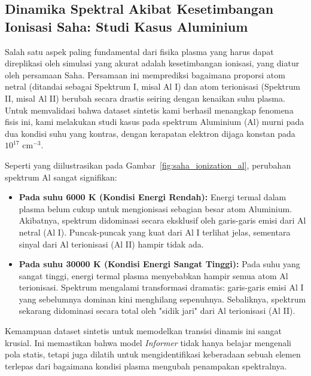 \subsection{Dinamika Spektral Akibat Kesetimbangan Ionisasi Saha: Studi Kasus Aluminium}
Salah satu aspek paling fundamental dari fisika plasma yang harus dapat direplikasi oleh simulasi yang akurat adalah kesetimbangan ionisasi, yang diatur oleh persamaan Saha. Persamaan ini memprediksi bagaimana proporsi atom netral (ditandai sebagai Spektrum I, misal Al I) dan atom terionisasi (Spektrum II, misal Al II) berubah secara drastis seiring dengan kenaikan suhu plasma. Untuk memvalidasi bahwa dataset sintetis kami berhasil menangkap fenomena fisis ini, kami melakukan studi kasus pada spektrum Aluminium (Al) murni pada dua kondisi suhu yang kontras, dengan kerapatan elektron dijaga konstan pada $10^{17}$ cm$^{-3}$.

Seperti yang diilustrasikan pada Gambar~\ref{fig:saha_ionization_al}, perubahan spektrum Al sangat signifikan:
\begin{itemize}
    \item \textbf{Pada suhu 6000 K (Kondisi Energi Rendah):} Energi termal dalam plasma belum cukup untuk mengionisasi sebagian besar atom Aluminium. Akibatnya, spektrum didominasi secara eksklusif oleh garis-garis emisi dari Al netral (Al I). Puncak-puncak yang kuat dari Al I terlihat jelas, sementara sinyal dari Al terionisasi (Al II) hampir tidak ada.
    \item \textbf{Pada suhu 30000 K (Kondisi Energi Sangat Tinggi):} Pada suhu yang sangat tinggi, energi termal plasma menyebabkan hampir semua atom Al terionisasi. Spektrum mengalami transformasi dramatis: garis-garis emisi Al I yang sebelumnya dominan kini menghilang sepenuhnya. Sebaliknya, spektrum sekarang didominasi secara total oleh "sidik jari" dari Al terionisasi (Al II).
\end{itemize}
Kemampuan dataset sintetis untuk memodelkan transisi dinamis ini sangat krusial. Ini memastikan bahwa model \textit{Informer} tidak hanya belajar mengenali pola statis, tetapi juga dilatih untuk mengidentifikasi keberadaan sebuah elemen terlepas dari bagaimana kondisi plasma mengubah penampakan spektralnya.

